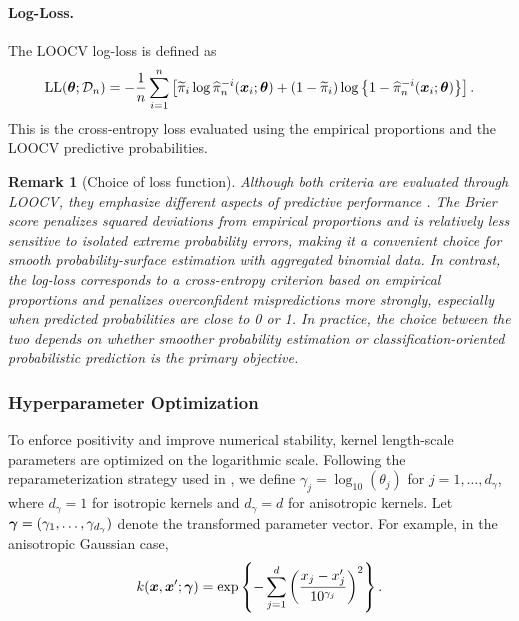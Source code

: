 \documentclass[article, shortnames]{jss}
\newtheorem{remark}{Remark}
\renewcommand{\vec}[1]{\mbox{\boldmath ${#1}$}}
\begin{document}
\paragraph{Log-Loss.}
The LOOCV log-loss is defined as
\begin{equation}\label{eq:log-loss}
	\mathrm{LL}(\vec{\theta}; \mathcal{D}_n) = -\frac{1}{n} \sum_{i=1}^{n} \left[ \widetilde{\pi}_i \log \widehat{\pi}_n^{-i}(\vec{x}_i;\vec{\theta}) + (1 - \widetilde{\pi}_i) \log \left\{1 - \widehat{\pi}_n^{-i}(\vec{x}_i;\vec{\theta})\right\} \right].
\end{equation}
This is the cross-entropy loss evaluated using the empirical proportions and the LOOCV predictive probabilities. 

\begin{remark}[Choice of loss function]
	Although both criteria are evaluated through LOOCV, they emphasize different aspects of predictive performance \citep{Gneiting2007ProperScoring, Flores2026ClassifierEvaluation}. 
	The Brier score penalizes squared deviations from empirical proportions and is relatively less sensitive to isolated extreme probability errors, making it a convenient choice for smooth probability-surface estimation with aggregated binomial data. 
	In contrast, the log-loss corresponds to a cross-entropy criterion based on empirical proportions and penalizes overconfident mispredictions more strongly, especially when predicted probabilities are close to 0 or 1. 
	In practice, the choice between the two depends on whether smoother probability estimation or classification-oriented probabilistic prediction is the primary objective.
\end{remark}

\subsubsection{Hyperparameter Optimization}\label{sec:HPO}

To enforce positivity and improve numerical stability, kernel length-scale parameters are optimized on the logarithmic scale. 
Following the reparameterization strategy used in \citet{MacDonald2015GPfit}, we define
$\gamma_j=\log_{10}(\theta_j)$ for $j=1,\ldots,d_\gamma$, where $d_\gamma=1$ for isotropic kernels and $d_\gamma=d$ for anisotropic kernels. 
Let $\vec{\gamma}=(\gamma_1,\ldots,\gamma_{d_\gamma})$ denote the transformed parameter vector. 
For example, in the anisotropic Gaussian case,
\begin{equation}\label{eq:reparameterization}
	k(\vec{x}, \vec{x}'; \vec\gamma) = \exp\left\{ -\sum_{j=1}^{d}\left(\frac{x_j - x_j'}{10^{\gamma_j}} \right)^2 \right\}.
\end{equation}
\end{document}
